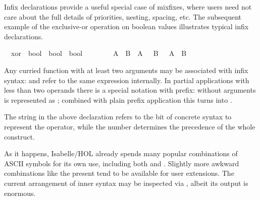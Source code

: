 \begin{isabellebody}
\begin{isamarkuptext}
  Infix declarations provide a useful special
  case of mixfixes, where users need not care about the full details
  of priorities, nesting, spacing, etc.  The subsequent example of the
  exclusive-or operation on boolean values illustrates typical infix
  declarations.%
\end{isamarkuptext}%
\isamarkuptrue%
\isanewline
\ \ xor\ {\isacharcolon}{\isacharcolon}\ {\isachardoublequote}bool\ {\isasymRightarrow}\ bool\ {\isasymRightarrow}\ bool{\isachardoublequote}\ \ \ \ {\isacharparenleft}\ {\isachardoublequote}{\isacharbrackleft}{\isacharplus}{\isacharbrackright}{\isachardoublequote}\ {}{}{\isacharparenright}\isanewline
\ \ {\isachardoublequote}A\ {\isacharbrackleft}{\isacharplus}{\isacharbrackright}\ B\ {\isasymequiv}\ {\isacharparenleft}A\ {\isasymand}\ {\isasymnot}\ B{\isacharparenright}\ {\isasymor}\ {\isacharparenleft}{\isasymnot}\ A\ {\isasymand}\ B{\isacharparenright}{\isachardoublequote}\isamarkupfalse%
%
\begin{isamarkuptext}%
Any curried function with at least two arguments may be associated
  with infix syntax:  and  refer to
  the same expression internally.  In partial applications with less
  than two operands there is a special notation with  prefix:
   without arguments is represented as ;
  combined with plain prefix application this turns 
  into .

  \medskip The string \isa{{\isachardoublequote}{\isacharbrackleft}{\isacharplus}{\isacharbrackright}{\isachardoublequote}} in the above declaration
  refers to the bit of concrete syntax to represent the operator,
  while the number  determines the precedence of the whole
  construct.

  As it happens, Isabelle/HOL already spends many popular combinations
  of ASCII symbols for its own use, including both \isa{{\isacharplus}} and
  \isa{{\isacharplus}{\isacharplus}}.  Slightly more awkward combinations like the present
  \isa{{\isacharbrackleft}{\isacharplus}{\isacharbrackright}} tend to be available for user extensions.  The current
  arrangement of inner syntax may be inspected via
  , albeit its output is enormous.


\end{isamarkuptext}
\end{isabellebody}
